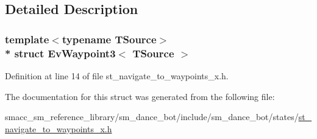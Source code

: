 \subsection{Detailed Description}
\subsubsection*{template$<$typename T\+Source$>$\\*
struct Ev\+Waypoint3$<$ T\+Source $>$}



Definition at line 14 of file st\+\_\+navigate\+\_\+to\+\_\+waypoints\+\_\+x.\+h.



The documentation for this struct was generated from the following file\+:\begin{DoxyCompactItemize}
\item 
smacc\+\_\+sm\+\_\+reference\+\_\+library/sm\+\_\+dance\+\_\+bot/include/sm\+\_\+dance\+\_\+bot/states/\hyperlink{st__navigate__to__waypoints__x_8h}{st\+\_\+navigate\+\_\+to\+\_\+waypoints\+\_\+x.\+h}\end{DoxyCompactItemize}
